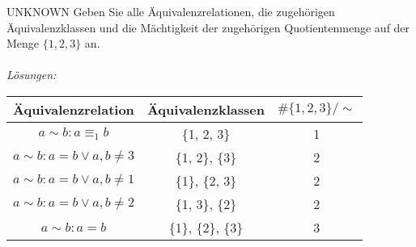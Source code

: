 \documentclass{problemset}
\author{Michael van Straten}
\begin{document}
\maketitle

\begin{problem}{UNKNOWN}
Geben Sie alle Äquivalenzrelationen, die zugehörigen Äquivalenzklassen und die Mächtigkeit der
zugehörigen Quotientenmenge auf der Menge $\{1, 2, 3\}$ an. \\
\\
\textit{Lösungen:}
\begin{center}
    \begin{tabular}{ | c | c | c | }
        \hline
        \textbf{Äquivalenzrelation}         & \textbf{Äquivalenzklassen} & $\#\{1,2,3\}/\sim$ \\
        \hline
        $a \sim b: a \equiv_1 b$            & \{1, 2, 3\}                & 1                  \\
        $a \sim b: a = b \lor a,b \not = 3$ & \{1, 2\}, \{3\}            & 2                  \\
        $a \sim b: a = b \lor a,b \not = 1$ & \{1\}, \{2, 3\}            & 2                  \\
        $a \sim b: a = b \lor a,b \not = 2$ & \{1, 3\}, \{2\}            & 2                  \\
        $a \sim b: a = b$                   & \{1\}, \{2\}, \{3\}        & 3                  \\
        \hline
    \end{tabular}
\end{center}
\end{problem}
\end{document}
